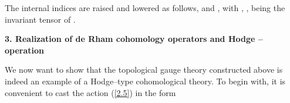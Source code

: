 \documentclass[a4paper,11pt]{article}
\begin{document}
The internal indices \coordHE{} are raised and lowered as follows,
\coordHE{} and 
\coordHE{}, with \coordHE{}, 
\coordHE{}, being the invariant tensor of 
\coordHE{}.
\bigskip
\begin{flushleft}
{\large{\bf 3. Realization of de Rham cohomology operators and 
Hodge \myHighlight{$\star$}\coordHE{}--operation }}
\end{flushleft}
\bigskip
We now want to show that the topological gauge theory constructed above is 
indeed an example of a Hodge--type cohomological theory. To begin with, 
it is convenient to cast the action 
(\ref{2.5}) in the form
\end{document}
